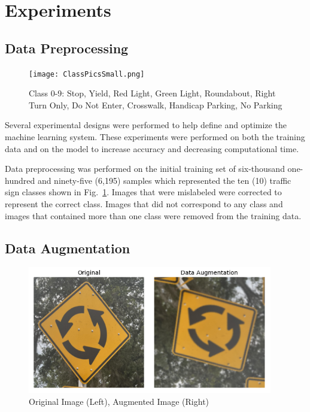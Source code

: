 \documentclass[conference]{IEEEtran}
\begin{document}
\section{Experiments}\label{sec:experiments}

\subsection{Data Preprocessing}
\begin{figure}[htbp]
\centerline{\texttt{[image: ClassPicsSmall.png]}}
\caption{Class 0-9: Stop, Yield, Red Light, Green Light, Roundabout, Right Turn Only, Do Not Enter, Crosswalk, Handicap Parking, No Parking}
\label{fig_classes}
\end{figure}

Several experimental designs were performed to help define and optimize the machine learning system. These experiments were performed on both the training data and on the model to increase accuracy and decreasing computational time.

Data preprocessing was performed on the initial training set of six-thousand one-hundred and ninety-five (6,195) samples which represented the ten (10) traffic sign classes shown in Fig.~\ref{fig_classes}. Images that were mislabeled were corrected to represent the correct class. Images that did not correspond to any class and images that contained more than one class were removed from the training data.

\subsection{Data Augmentation}
\begin{figure}[htbp]
\centerline{\includegraphics{DataAugmentation_Small.png}}
\caption{Original Image (Left), Augmented Image (Right)}
\label{fig_dataaug}
\end{figure}
\end{document}
